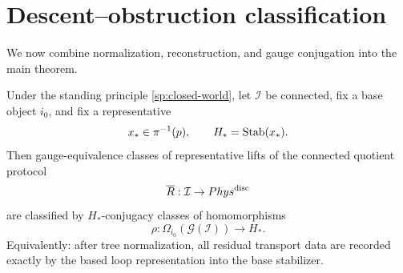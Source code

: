 \section{Descent--obstruction classification}
We now combine normalization, reconstruction, and gauge conjugation into
the main theorem.
\begin{theorem}
	\label{thm:DO-classification}
	Under the standing principle \cref{sp:closed-world}, let
	\(\mathcal I\) be connected, fix a base object \(i_0\), and fix a
	representative
	\[
		x_*\in \pi^{-1}(p),
		\qquad
		H_*=\operatorname{Stab}(x_*).
	\]
	Then gauge-equivalence classes of representative lifts of the connected
	quotient protocol
	\[
		\overline R:\mathcal I\to Phys^{\mathrm{disc}}
	\]
	are classified by \(H_*\)-conjugacy classes of homomorphisms
	\[
		\rho:\Omega_{i_0}(\mathcal G(\mathcal I))\to H_*.
	\]
	Equivalently: after tree normalization, all residual transport data are
	recorded exactly by the based loop representation into the base
	stabilizer.
\end{theorem}
